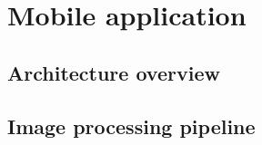 \section{Mobile application}
\label{sec:Mobile application}

\subsection{Architecture overview}

\subsection{Image processing pipeline}